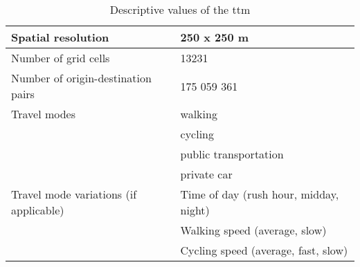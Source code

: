 \begin{table}[H]
	\caption{Descriptive values of the \acrshort{ttm}}
	\label{tab:ttm description}
	\centering
	\begin{tabular}{ | L{0.4\textwidth} | L{0.5\textwidth} | }
		\hline
		Spatial resolution
		& 250 x 250 m
		\\
		\hline
		Number of grid cells
		& 13231
		\\
		\hline
		Number of origin-destination pairs
		& 175 059 361
		\\
		\hline
		Travel modes
		& \tabitem walking \\
		& \tabitem cycling \\
		& \tabitem public transportation \\
		& \tabitem private car \\
		\hline
		Travel mode variations (if applicable)
		& \tabitem Time of day (rush hour, midday, night) \\
		& \tabitem Walking speed (average, slow) \\
		& \tabitem Cycling speed (average, fast, slow) \\
		\hline
	\end{tabular}
\end{table}
